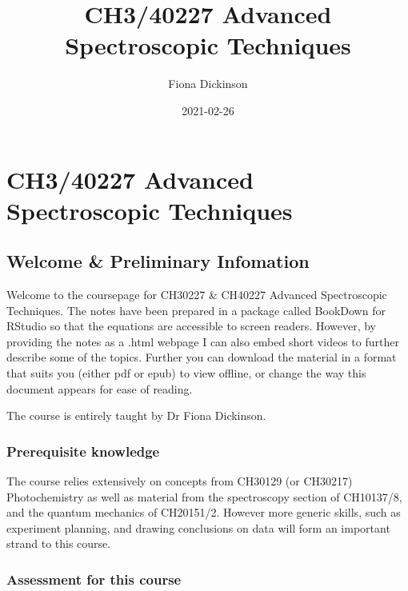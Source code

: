 \documentclass[
]{book}
\title{CH3/40227 Advanced Spectroscopic Techniques}
\author{Fiona Dickinson}
\date{2021-02-26}
\begin{document}
\maketitle

{
\setcounter{tocdepth}{1}
\tableofcontents
}
\hypertarget{ch340227-advanced-spectroscopic-techniques}{%
\chapter*{CH3/40227 Advanced Spectroscopic Techniques}\label{ch340227-advanced-spectroscopic-techniques}}

\hypertarget{welcome-preliminary-infomation}{%
\section*{Welcome \& Preliminary Infomation}\label{welcome-preliminary-infomation}}

Welcome to the coursepage for CH30227 \& CH40227 Advanced Spectroscopic Techniques. The notes have been prepared in a package called BookDown for RStudio so that the equations are accessible to screen readers. However, by providing the notes as a .html webpage I can also embed short videos to further describe some of the topics. Further you can download the material in a format that suits you (either pdf or epub) to view offline, or change the way this document appears for ease of reading.

The course is entirely taught by Dr Fiona Dickinson.

\hypertarget{prerequisite-knowledge}{%
\subsection*{Prerequisite knowledge}\label{prerequisite-knowledge}}

The course relies extensively on concepts from CH30129 (or CH30217) Photochemistry as well as material from the spectroscopy section of CH10137/8, and the quantum mechanics of CH20151/2. However more generic skills, such as experiment planning, and drawing conclusions on data will form an important strand to this course.

\hypertarget{assessment-for-this-course}{%
\subsection*{Assessment for this course}\label{assessment-for-this-course}}
\end{document}
